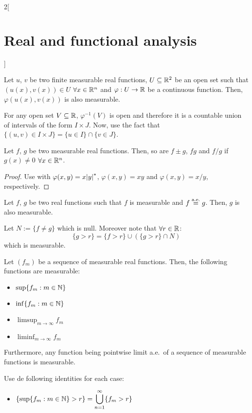 \documentclass[../../../main_math.tex]{subfiles}
\begin{document}
\begin{multicols}{2}[\section{Real and functional analysis}]
\begin{proposition}
    Let $u$, $v$ be two finite measurable real functions, $U\subseteq\mathbb{R}^2$ be an open set such that $(u(x),v(x))\in U$ $\forall x\in\mathbb{R}^n$ and $\varphi:U\rightarrow\mathbb{R}$ be a continuous function. Then, $\varphi(u(x),v(x))$ is also measurable.
  \end{proposition}
  \begin{sproof}
    For any open set $V\subseteq\mathbb{R}$, $\varphi^{-1}(V)$ is open and therefore it is a countable union of intervals of the form $I\times J$. Now, use the fact that $\{(u,v)\in I\times J\}=\{u\in I\}\cap\{v\in J\}$.
  \end{sproof}
  \begin{proposition}
    Let $f$, $g$ be two measurable real functions. Then, so are $f\pm g$, $fg$ and $f/g$ if $g(x)\ne 0$ $\forall x\in\mathbb{R}^n$.
  \end{proposition}
  \begin{proof}
    Use  with $\varphi(x,y)=x\om y$, $\varphi(x,y)=xy$ and $\varphi(x,y)=x/y$, respectively.
  \end{proof}
  \begin{proposition}
    Let $f$, $g$ be two real functions such that $f$ is measurable and $f\overset{\text{a.e.}}{=} g$. Then, $g$ is also measurable.
  \end{proposition}
  \begin{sproof}
    Let $N:=\{f\ne g\}$ which is null. Moreover note that $\forall r\in\mathbb{R}$:
    $$\{g>r\}=\{f>r\} \cup (\{g>r\}\cap N)$$
    which is measurable.
  \end{sproof}
  \begin{proposition}
    Let $(f_m)$ be a sequence of measurable real functions. Then, the following functions are measurable:
    \begin{itemize}
      \item $\displaystyle\sup\{f_m:m\in\mathbb{N}\}$
      \item $\displaystyle\inf\{f_m:m\in\mathbb{N}\}$
      \item $\displaystyle\limsup_{m\to\infty} f_m$
      \item $\displaystyle\liminf_{m\to\infty} f_m$
    \end{itemize}
    Furthermore, any function being pointwise limit a.e.\ of a sequence of measurable functions is measurable.
  \end{proposition}
  \begin{sproof}
    Use de following identities for each case:
    \begin{itemize}
      \item $\displaystyle\{\sup\{f_m:m\in\mathbb{N}\}>r\}=\bigcup_{n=1}^\infty \{f_m> r\}$

\end{itemize}
\end{sproof}
\end{multicols}
\end{document}
